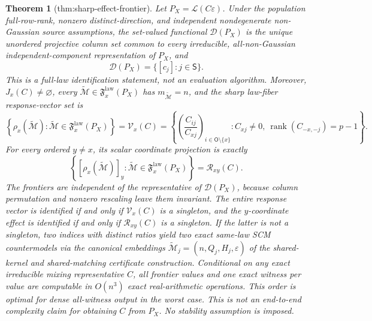 \documentclass{article}
\newtheorem{theorem}{Theorem}
\begin{document}
\begin{theorem}[thm:sharp-effect-frontier]\label{thm:sharp-effect-frontier}
Let \(P_X=\mathcal L(C\varepsilon)\). Under the population full-row-rank, nonzero distinct-direction, and independent nondegenerate non-Gaussian source assumptions, the set-valued functional \(\mathcal D(P_X)\) is the unique unordered projective column set common to every irreducible, all-non-Gaussian independent-component representation of \(P_X\), and
\[
 \mathcal D(P_X)=\{[c_j]:j\in\mathsf S\}.
\]
This is a full-law identification statement, not an evaluation algorithm. Moreover, \(J_x(C)\ne\varnothing\), every \(\widetilde{\mathcal M}\in\mathfrak F_x^{\mathrm{law}}(P_X)\) has \(m_{\widetilde{\mathcal M}}=n\), and the sharp law-fiber response-vector set is
\[
 \left\{\rho_x(\widetilde{\mathcal M}):\widetilde{\mathcal M}\in\mathfrak F_x^{\mathrm{law}}(P_X)\right\}
 =\mathcal V_x(C)
 =\left\{\left(\frac{C_{ij}}{C_{xj}}\right)_{i\in\mathsf O\setminus\{x\}}:C_{xj}\ne0,\ \operatorname{rank}(C_{-x,-j})=p-1\right\}.
\]
For every ordered \(y\ne x\), its scalar coordinate projection is exactly
\[
 \left\{[\rho_x(\widetilde{\mathcal M})]_y:\widetilde{\mathcal M}\in\mathfrak F_x^{\mathrm{law}}(P_X)\right\}
 =\mathcal R_{xy}(C).
\]
The frontiers are independent of the representative of \(\mathcal D(P_X)\), because column permutation and nonzero rescaling leave them invariant. The entire response vector is identified if and only if \(\mathcal V_x(C)\) is a singleton, and the \(y\)-coordinate effect is identified if and only if \(\mathcal R_{xy}(C)\) is a singleton. If the latter is not a singleton, two indices with distinct ratios yield two exact same-law SCM countermodels via the canonical embeddings \(\widetilde{\mathcal M}_j=(n,Q_j,H_j,\varepsilon)\) of the shared-kernel and shared-matching certificate construction. Conditional on any exact irreducible mixing representative \(C\), all frontier values and one exact witness per value are computable in \(O(n^3)\) exact real-arithmetic operations. This order is optimal for dense all-witness output in the worst case. This is not an end-to-end complexity claim for obtaining \(C\) from \(P_X\). No stability assumption is imposed.
\end{theorem}
\end{document}
